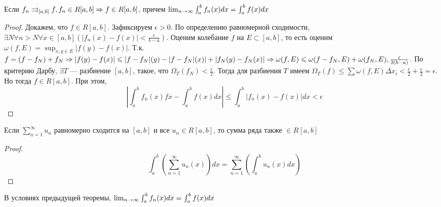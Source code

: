 \begin{theorem}
    Если \(f_n \rightrightarrows_{[a, b]} f, f_n \in R[a, b] \Rightarrow f \in R[a, b]\), причем \(\lim_{n \rightarrow \infty} \int_a^b f_n(x) dx = \int_a^b f(x)dx\)
\end{theorem}
\begin{proof}
    Докажем, что \(f \in R[a, b]\). Зафиксируем \(\epsilon > 0\). По определению равномерной сходимости, \(\exists N \forall n > N \forall x \in [a, b]\left(|f_n(x) - f(x)| < \frac{\epsilon}{b - a}\right)\). Оценим колебание \(f\) на \(E \subset [a, b]\), то есть оценим  \(\omega(f, E) = \sup_{x, y \in E}|f(y) - f(x)|\). Т.к. \(f = (f - f_N) + f_N \Rightarrow |f(y) - f(x)| \leqslant |f - f_N|(y) - |f - f_N|(x)| + |f_N(y) - f_N(x)| \Rightarrow \omega(f, E) \leqslant \omega (f - f_N, E) + \omega (f_N, E), \frac{\varepsilon}{2(b - a)}\). По критерию Дарбу, \(\exists T\) --- разбиение \([a, b]\), такое, что \(\Omega_T(f_N) < \frac{\epsilon}{2}\). Тогда для разбиения \(T\) имеем \(\Omega_T(f) \le \sum \omega(f, E)\Delta x_i < \frac{\epsilon}{2} + \frac{\epsilon}{2} = \epsilon\). Но тогда \(f \in R[a, b]\). При этом,
    \[\left|\int_a^b f_n(x)fx - \int_a^b f(x)dx\right| \le \int_a^b |f_n(x) - f(x)|dx < \epsilon\]
\end{proof}

\begin{corollary}
    Если \(\sum_{n = 1}^\infty u_n\) равномерно сходится на \([a, b]\) и все \(u_n \in R[a, b]\), то сумма ряда также \(\in R[a, b]\)
\end{corollary}
\begin{proof}
    \[\int_a^b\left(\sum_{n = 1}^\infty u_n(x)\right)dx = \sum_{n = 1}^\infty \left(\int_a^b u_n(x) dx\right)\]
\end{proof}

\begin{note}
    В условиях предыдущей теоремы, \(\lim_{n \rightarrow \infty}\int_a^b f_n(x)dx = \int_a^b f(x)dx\)
\end{note}

